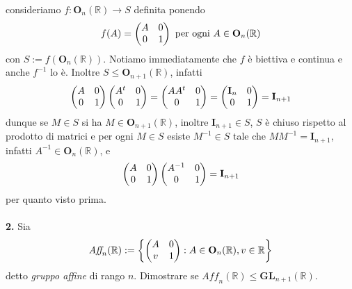 \documentclass[oneside, 11pt]{amsbook}
\makeatletter
\newcommand{\0}{{(0)}}
\newcommand{\3}{{(3)}}
\theoremstyle{colonplain}
\theoremstyle{colondefinition}
\theoremstyle{colonremark}
\numberwithin{equation}{chapter}
\renewcommand{\proofname}{Dimostrazione}
\renewenvironment{proof}[1][\proofname]{\par
  \pushQED{\qed}%
  \normalfont \topsep6\p@\@plus6\p@\relax
  \trivlist
  \item[\hskip\labelsep\bfseries #1:]\ignorespaces
}{%
  \popQED\endtrivlist\@endpefalse
}
\makeatother
\begin{document}
\begin{proof} consideriamo $f : \mathbf{O}_n(\mathbb{R}) \longrightarrow S$ definita ponendo
\begin{align}
    f(A) = \begin{pmatrix}
        A & 0 \\
        0 & 1
    \end{pmatrix} \text{ per ogni } A \in \mathbf{O}_n(\mathbb{R}) \notag
\end{align}
con $S := f(\mathbf{O}_n(\mathbb{R}))$. Notiamo immediatamente che $f$ è biettiva e continua e anche $f^{-1}$ lo è. Inoltre $S \leq \mathbf{O}_{n + 1}(\mathbb{R})$, infatti
\begin{align}
    \begin{pmatrix}
        A & 0 \\
        0 & 1
    \end{pmatrix}
    \begin{pmatrix}
        A^t & 0 \\
        0 & 1
    \end{pmatrix} = 
    \begin{pmatrix}
        AA^t & 0 \\
        0 & 1
    \end{pmatrix} = 
    \begin{pmatrix}
        \mathbf{I}_n & 0 \\
        0 & 1
    \end{pmatrix} = \mathbf{I}_{n + 1} \notag
\end{align}
dunque se $M \in S$ si ha $M \in \mathbf{O}_{n + 1}(\mathbb{R})$, inoltre $\mathbf{I}_{n + 1} \in S$, $S$ è chiuso rispetto al prodotto di matrici e per ogni $M \in S$ esiste $M^{-1} \in S$ tale che $MM^{-1} = \mathbf{I}_{n + 1}$, infatti $A^{-1} \in \mathbf{O}_n(\mathbb{R})$, e
\begin{align}
    \begin{pmatrix}
        A & 0 \\
        0 & 1
    \end{pmatrix}
    \begin{pmatrix}
        A^{-1} & 0 \\
        0 & 1
    \end{pmatrix} = 
    \mathbf{I}_{n + 1} \notag
\end{align}
per quanto visto prima. \\ \\
\end{proof}
\textbf{2.} Sia
\begin{align}
    \textit{Aff}_n(\mathbb{R}) := \left\{ \begin{pmatrix}
        A & 0 \\
        v & 1
    \end{pmatrix} : A \in \mathbf{O}_n(\mathbb{R}), v \in \mathbb{R} \right\} \notag
\end{align}
detto \textit{gruppo affine} di rango $n$. Dimostrare se $\textit{Aff}_n(\mathbb{R}) \leq \mathbf{GL}_{n + 1}(\mathbb{R})$. \\
\end{document}
